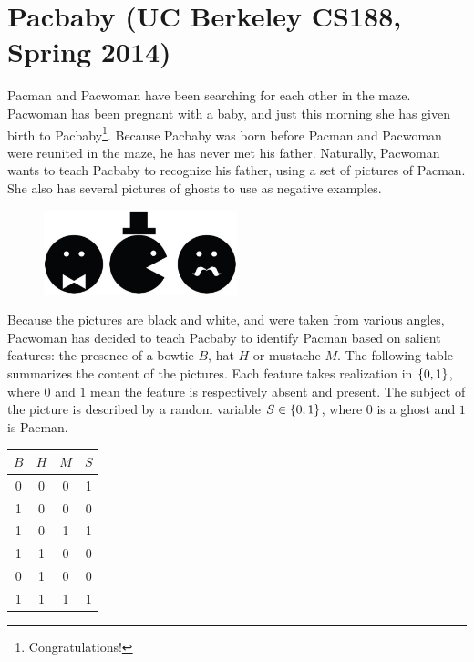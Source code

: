 \documentclass[11pt, a4paper]{article}
\begin{document}
\newpage

\section{Pacbaby (UC Berkeley CS188, Spring 2014)}

Pacman and Pacwoman have been searching for each other in the maze. Pacwoman has been pregnant with a baby, and just this morning she has given birth to Pacbaby\footnote{Congratulations!}. Because Pacbaby was born before Pacman and Pacwoman were reunited in the maze, he has never met his father. Naturally, Pacwoman wants to teach Pacbaby to recognize his father, using a set of pictures of Pacman. She also has several pictures of ghosts to use as negative examples.

\begin{figure}[h]
    \centering
    \includegraphics[width=0.5\textwidth]{figures/e5_pacbaby.jpg}
\end{figure}

Because the pictures are black and white, and were taken from various angles, Pacwoman has decided to teach Pacbaby to identify Pacman based on salient features: the presence of a bowtie $B$, hat $H$ or mustache $M$. The following table summarizes the content of the pictures. Each feature takes realization in $\{0, 1\}$, where $0$ and $1$ mean the feature is respectively absent and present. The subject of the picture is described by a random variable $S \in \{0, 1\}$, where $0$ is a ghost and $1$ is Pacman.

\begin{table}[h]
    \centering
    \begin{tabular}{ccc|c}
        \toprule
        $B$ & $H$ & $M$ & $S$ \\
        \midrule
        0 & 0 & 0 & 1 \\
        1 & 0 & 0 & 0 \\
        1 & 0 & 1 & 1 \\
        1 & 1 & 0 & 0 \\
        0 & 1 & 0 & 0 \\
        1 & 1 & 1 & 1 \\
        \bottomrule
    \end{tabular}
\end{table}
\end{document}
